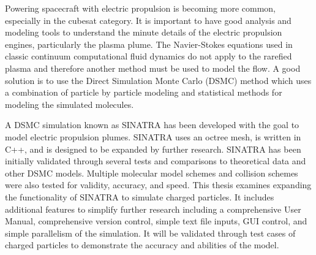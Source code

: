 Powering spacecraft with electric propulsion is becoming more common, especially in the cubesat category. It is important to have good analysis and modeling tools to understand the minute details of the electric propulsion engines, particularly the plasma plume. The Navier-Stokes equations used in classic continuum computational fluid dynamics do not apply to the rarefied plasma and therefore another method must be used to model the flow. A good solution is to use the Direct Simulation Monte Carlo (DSMC) method which uses a combination of particle by particle modeling and statistical methods for modeling the simulated molecules. 

A DSMC simulation known as SINATRA has been developed with the goal to model electric propulsion plumes. SINATRA uses an octree mesh, is written in C++, and is designed to be expanded by further research. SINATRA has been initially validated through several tests and comparisons to theoretical data and other DSMC models. Multiple molecular model schemes and collision schemes were also tested for validity, accuracy, and speed. This thesis examines expanding the functionality of SINATRA to simulate charged particles. It includes additional features to simplify further research including  a comprehensive User Manual, comprehensive version control, simple text file inputs, GUI control, and simple parallelism of the simulation. It will be validated through test cases of charged particles to demonstrate the accuracy and abilities of the model.
